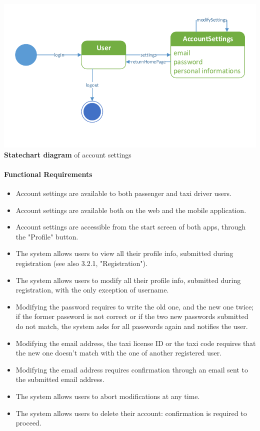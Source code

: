 			\begin{center}
				\includegraphics[width=\textwidth]{diagrams/settings}
				\textbf{Statechart diagram} of account settings
			\end{center}
	
	\paragraph{Functional Requirements}
		\begin{itemize}
			\item Account settings are available to both passenger and taxi driver users.
			\item Account settings are available both on the web and the mobile application.
			\item Account settings are accessible from the start screen of both apps, through the "Profile" button.
			\item The system allows users to view all their profile info, submitted during registration (see also 3.2.1, "Registration").
			\item The system allows users to modify all their profile info, submitted during registration, with the only exception of username.
			\item Modifying the password requires to write the old one, and the new one twice; if the former password is not correct or if the two new passwords submitted do not match, the system asks for all passwords again and notifies the user.
			\item Modifying the email address, the taxi license ID or the taxi code requires that the new one doesn't match with the one of another registered user.
			\item Modifying the email address requires confirmation through an email sent to the submitted email address.
			\item The system allows users to abort modifications at any time.
			\item The system allows users to delete their account: confirmation is required to proceed.
		\end{itemize}
